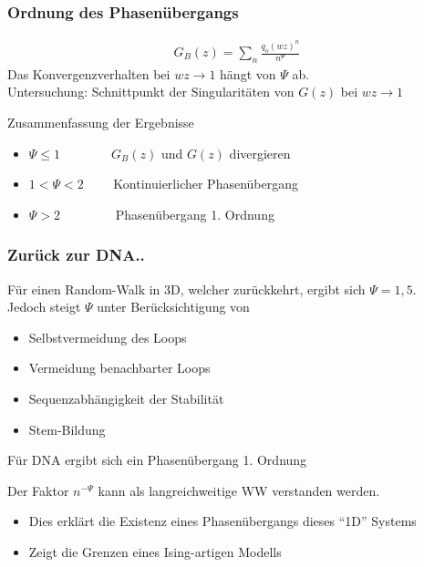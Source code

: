 \begin{frame}
\frametitle{\large Ordnung des Phasenübergangs}
\begin{align*}
G_B(z)=\sum_n \frac{q_o (wz)^n}{n^\Psi}
\end{align*}
\centering
Das Konvergenzverhalten bei $wz\rightarrow 1$ hängt von $\Psi$ ab.\\
\vspace{0.3cm}
Untersuchung: Schnittpunkt der Singularitäten von $G(z)$ bei $wz\rightarrow1$

\vspace{0.3cm}
\begin{block}{Zusammenfassung der Ergebnisse}
\begin{itemize}
\item $\Psi \leq1\qquad\qquad$$G_B(z)$ und $G(z)$ divergieren
\item $1<\Psi<2\qquad$  Kontinuierlicher Phasenübergang
\item $\Psi>2\qquad\qquad$ Phasenübergang 1. Ordnung
\end{itemize}
\end{block}
\vspace{0.3cm}
\end{frame}


\begin{frame}
\frametitle{Zurück zur DNA..}
Für einen Random-Walk in 3D, welcher zurückkehrt, ergibt sich $\Psi=1,5$.\\
Jedoch steigt $\Psi$ unter Berücksichtigung von
\begin{itemize}
\item Selbstvermeidung des Loops
\item Vermeidung benachbarter Loops
\item Sequenzabhängigkeit der Stabilität
\item Stem-Bildung
\end{itemize}
\begin{block}{}
Für DNA ergibt sich ein Phasenübergang 1. Ordnung
\end{block}
Der Faktor $n^{-\Psi}$ kann als langreichweitige WW verstanden werden.
\begin{itemize}
\item Dies erklärt die Existenz eines Phasenübergangs dieses "`1D"' Systems
\item Zeigt die Grenzen eines Ising-artigen Modells
\end{itemize}
\end{frame}